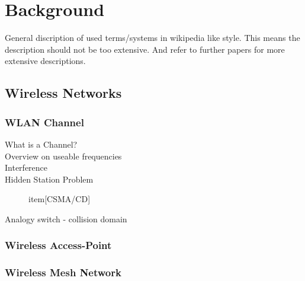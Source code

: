 \chapter{Background}
General discription of used terms/systems in wikipedia like style. This means the description should not be too extensive.
And refer to further papers for more extensive descriptions.
\section{Wireless Networks}
  \subsection{WLAN Channel}
    \begin{description}
    \item[What is a Channel?]
    \item[Overview on useable frequencies]
    \item[Interference]
    \item[Hidden Station Problem]
    item[\ac{CSMA/CD}]
    \item[Analogy switch - collision domain]
    \end{description}
  \subsection{Wireless Access-Point}
  \subsection{Wireless Mesh Network}
    \cite{Akyildiz2005445}
    \cite{airberry}
